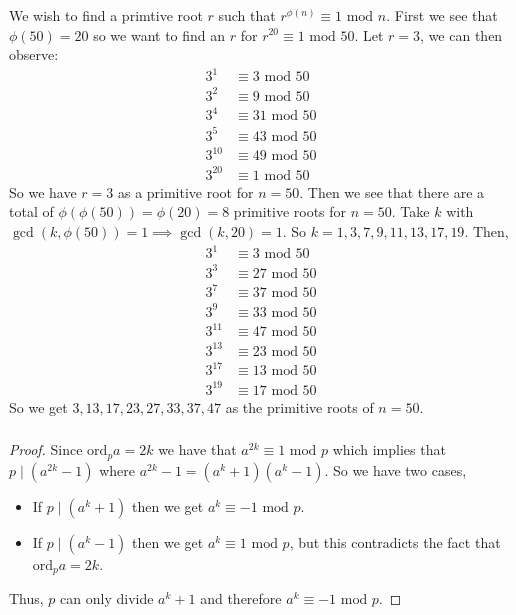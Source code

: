 \documentclass[class=article, crop=false]{standalone}
\def\ord{{\text{ord}}}
\begin{document}
\subsubsection{}
We wish to find a primtive root $r$ such that $r^{\phi(n)} \equiv 1\mbox{ mod }n$.
  First we see that $\phi(50) = 20$ so we want to find an $r$ for $r^{20} \equiv 1\mbox{ mod } 50$.
  Let $r=3$, we can then observe:
  \begin{align*}
    3^{1} &\equiv 3 \mbox{ mod } 50 \\
    3^{2} &\equiv 9 \mbox{ mod } 50 \\
    3^{4} &\equiv 31 \mbox{ mod } 50 \\
    3^{5} &\equiv 43 \mbox{ mod } 50 \\
    3^{10} &\equiv 49 \mbox{ mod } 50 \\
    3^{20} &\equiv 1 \mbox{ mod } 50 
  \end{align*}
  So we have $r=3$ as a primitive root for $n=50$. Then we see that there are a total of
  $\phi(\phi(50)) = \phi(20) = 8$ primitive roots for $n=50$. Take $k$ with 
  $\gcd(k,\phi(50))=1 \implies \gcd(k, 20)=1$. So $k=1,3,7,9,11,13,17,19$. Then,
  \begin{align*}
    3^{1} &\equiv 3 \mbox{ mod } 50 \\
    3^{3} &\equiv 27 \mbox{ mod } 50 \\
    3^{7} &\equiv 37 \mbox{ mod } 50 \\
    3^{9} &\equiv 33 \mbox{ mod } 50 \\
    3^{11} &\equiv 47 \mbox{ mod } 50 \\
    3^{13} &\equiv 23 \mbox{ mod } 50 \\
    3^{17} &\equiv 13 \mbox{ mod } 50 \\
    3^{19} &\equiv 17 \mbox{ mod } 50
  \end{align*}
  So we get $3,13,17,23,27,33,37,47$ as the primitive roots of $n=50$.

\subsubsection{}
\begin{proof}
	Since $\ord_p a = 2k$ we have that $a^{2k}\equiv 1\mbox{ mod }p$ which implies that
	$p\mid\left(a^{2k}-1\right)$ where $a^{2k} -1 = (a^k + 1)(a^k -1)$. So we have two cases,
	\begin{itemize}
		\item If $p\mid (a^k + 1)$ then we get $a^k \equiv -1 \mbox{ mod }p$.
		\item If $p\mid (a^k - 1)$ then we get $a^k \equiv 1 \mbox{ mod }p$, but this
		contradicts the fact that $\ord_p a = 2k$.
	\end{itemize}
	Thus, $p$ can only divide $a^k + 1$ and therefore $a^k \equiv -1 \mbox{ mod }p$.
\end{proof}
\end{document}
